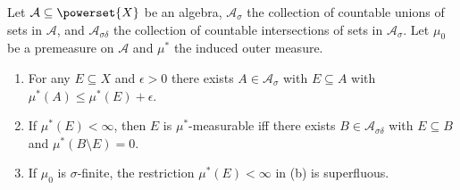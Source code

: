 \documentclass[article, a4paper, 11pt, oneside]{memoir}
\numberwithin{equation}{chapter}
\newcommand{\calA}{\mathcal{A}}
\theoremstyle{nonumberplain}
\begin{document}
\begin{exerciseframed*}[18]
    Let $\calA \subseteq \powerset{X}$ be an algebra, $\calA_\sigma$ the collection of countable unions of sets in $\calA$, and $\calA_{\sigma\delta}$ the collection of countable intersections of sets in $\calA_\sigma$. Let $\mu_0$ be a premeasure on $\calA$ and $\mu^*$ the induced outer measure.
    \begin{enumerate}
        \item For any $E \subseteq X$ and $\epsilon > 0$ there exists $A \in \calA_\sigma$ with $E \subseteq A$ with $\mu^*(A) \leq \mu^*(E) + \epsilon$.

        \item If $\mu^*(E) < \infty$, then $E$ is $\mu^*$-measurable iff there exists $B \in \calA_{\sigma\delta}$ with $E \subseteq B$ and $\mu^*(B \setminus E) = 0$.

        \item If $\mu_0$ is $\sigma$-finite, the restriction $\mu^*(E) < \infty$ in (b) is superfluous.
    \end{enumerate}
\end{exerciseframed*}
\end{document}

